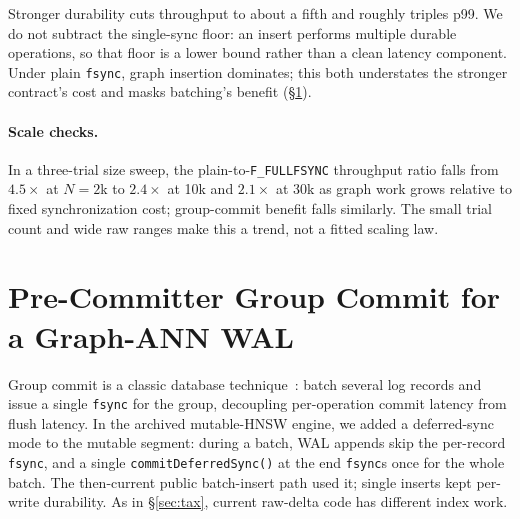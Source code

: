 \documentclass[sigconf,nonacm,balance=false]{acmart}
\newcommand{\fullfsync}{\texttt{F\_FULLFSYNC}}
\newcommand{\fsync}{\texttt{fsync}}
\begin{document}
Stronger durability cuts throughput to about a fifth and roughly triples p99.
We do not subtract the single-sync floor: an insert performs multiple durable
operations, so that floor is a lower bound rather than a clean latency component.
Under plain \fsync{}, graph insertion dominates; this both understates the
stronger contract's cost and masks batching's benefit (\S\ref{sec:groupcommit}).

\paragraph{Scale checks.} In a three-trial size sweep, the plain-to-\fullfsync{}
throughput ratio falls from $4.5\times$ at $N=2$k to $2.4\times$ at 10k and
$2.1\times$ at 30k as graph work grows relative to fixed synchronization cost;
group-commit benefit falls similarly. The small trial count and wide raw ranges
make this a trend, not a fitted scaling law.

\section{Pre-Committer Group Commit for a Graph-ANN WAL}
\label{sec:groupcommit}
Group commit is a classic database technique~\cite{aether}: batch several log
records and issue a single \fsync{} for the group, decoupling per-operation commit
latency from flush latency. In the archived mutable-HNSW engine, we added a
deferred-sync mode to the mutable segment:
during a batch, WAL appends skip the per-record \fsync{}, and a single
\texttt{commitDeferredSync()} at the end \fsync{}s once for the whole batch. The
then-current public batch-insert path used it; single inserts kept per-write
durability. As in \S\ref{sec:tax}, current raw-delta code has different index work.
\end{document}
